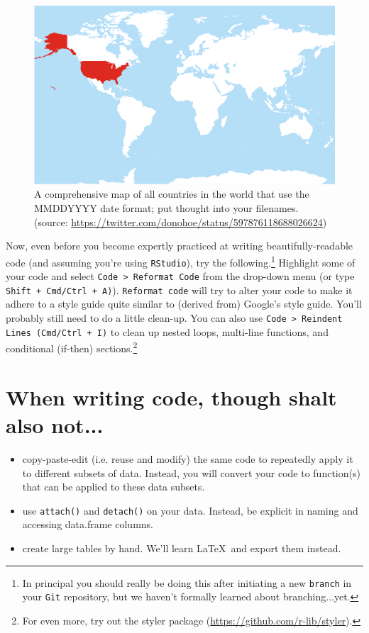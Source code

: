 \documentclass[12pt,letterpaper]{article}
\begin{document}
\begin{figure}[H]
	\centering
	\includegraphics[width=0.6\linewidth]{figs/MapMMDDYYYY.png}
	\caption{A comprehensive map of all countries in the world that use the MMDDYYYY date format; put thought into your filenames. (source: \url{https://twitter.com/donohoe/status/597876118688026624})}
	\label{fig:mapMMDDYYYY}
\end{figure}

Now, even before you become expertly practiced at writing beautifully-readable code (and assuming you're using \texttt{RStudio}), try the following.\footnote{In principal you should really be doing this after initiating a new \texttt{branch} in your \texttt{Git} repository, but we haven't formally learned about branching...yet.}
Highlight some of your code and select \texttt{Code > Reformat Code} from the drop-down menu (or type \texttt{Shift + Cmd/Ctrl + A)}).
\texttt{Reformat code} will try to alter your code to make it adhere to a style guide quite similar to (derived from) Google's style guide.
You'll probably still need to do a little clean-up.
You can also use \texttt{Code > Reindent Lines (Cmd/Ctrl + I)} to clean up nested loops, multi-line functions, and conditional (if-then) sections.\footnote{For even more, try out the styler package (\url{https://github.com/r-lib/styler}).}





\section{When writing code, though shalt also not...}

\begin{itemize}
	\item copy-paste-edit (i.e. reuse and modify) the same code to repeatedly apply it to different subsets of data.  Instead, you will convert your code to function(s) that can be applied to these data subsets.
	\item use \texttt{attach()} and \texttt{detach()} on your data.  Instead, be explicit in naming and accessing data.frame columns.
	\item create large tables by hand. We'll learn \LaTeX\ and export them instead.
\end{itemize}
\end{document}
